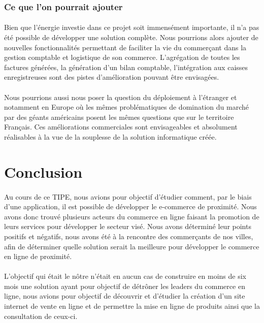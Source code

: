 \documentclass[a4paper, 12pt]{article}
\begin{document}
\subsubsection{Ce que l'on pourrait ajouter}

\paragraph{}Bien que l’énergie investie dans ce projet soit immensément importante, il n’a pas été possible de développer une solution complète. Nous pourrions alors ajouter de nouvelles fonctionnalités permettant de faciliter la vie du commerçant dans la gestion comptable et logistique de son commerce. L’agrégation de toutes les factures générées, la génération d’un bilan comptable, l’intégration aux caisses enregistreuses sont des pistes d’amélioration pouvant être envisagées.
\paragraph{}Nous pourrions aussi nous poser la question du déploiement à l’étranger et notamment en Europe où les mêmes problématiques de domination du marché par des géants américains posent les mêmes questions que sur le territoire Français. Ces améliorations commerciales sont envisageables et absolument réalisables à la vue de la souplesse de la solution informatique créée.


\newpage
\section{Conclusion}

\paragraph{}Au cours de ce TIPE, nous avions pour objectif d’étudier comment, par le biais d’une application, il est possible de développer le e-commerce de proximité. Nous avons donc trouvé plusieurs acteurs du commerce en ligne faisant la promotion de leurs services pour développer le secteur visé. Nous avons déterminé leur points positifs et négatifs, nous avons été à la rencontre des commerçants de nos villes, afin de déterminer quelle solution serait la meilleure pour développer le commerce en ligne de proximité.
\paragraph{}L’objectif qui était le nôtre n’était en aucun cas de construire en moins de six mois une solution ayant pour objectif de détrôner les leaders du commerce en ligne, nous avions pour objectif de découvrir et d’étudier la création d’un site internet de vente en ligne et de permettre la mise en ligne de produits ainsi que la consultation de ceux-ci.
\end{document}
